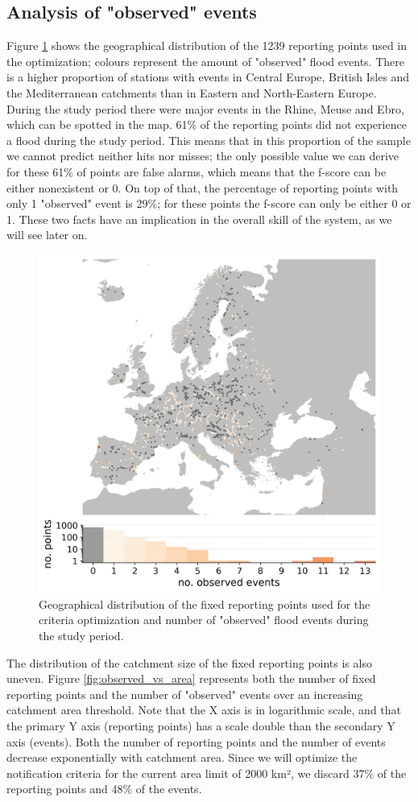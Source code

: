 \documentclass[preprint,12pt]{elsarticle}
\begin{document}
\subsection{Analysis of "observed" events}
\label{sec:obs_events}

Figure \ref{fig:map_observed} shows the geographical distribution of the 1239 reporting points used in the optimization; colours represent the amount of "observed" flood events. There is a higher proportion of stations with events in Central Europe, British Isles and the Mediterranean catchments than in Eastern and North-Eastern Europe. During the study period there were major events in the Rhine, Meuse and Ebro, which can be spotted in the map. 61\% of the reporting points did not experience a flood during the study period. This means that in this proportion of the sample we cannot predict neither hits nor misses; the only possible value we can derive for these 61\% of points are false alarms, which means that the f-score  can be either nonexistent or 0. On top of that, the percentage of reporting points with only 1 "observed" event is 29\%; for these points the f-score can only be either 0 or 1. These two facts have an implication in the overall skill of the system, as we will see later on.

\begin{figure}
    \centering
    \includegraphics[width=0.5\linewidth]{figures/map_observed_events_2000km2_1239points.jpg}
    \caption{Geographical distribution of the fixed reporting points used for the criteria optimization and number of "observed" flood events during the study period.}
    \label{fig:map_observed}
\end{figure}

The distribution of the catchment size of the fixed reporting points is also uneven. Figure \ref{fig:observed_vs_area} represents both the number of fixed reporting points and the number of "observed" events over an increasing catchment area threshold. Note that the X axis is in logarithmic scale, and that the primary Y axis (reporting points) has a scale double than the secondary Y axis (events). Both the number of reporting points and the number of events decrease exponentially with catchment area. Since we will optimize the notification criteria for the current area limit of 2000 km², we discard 37\% of the reporting points and 48\% of the events.
\end{document}
